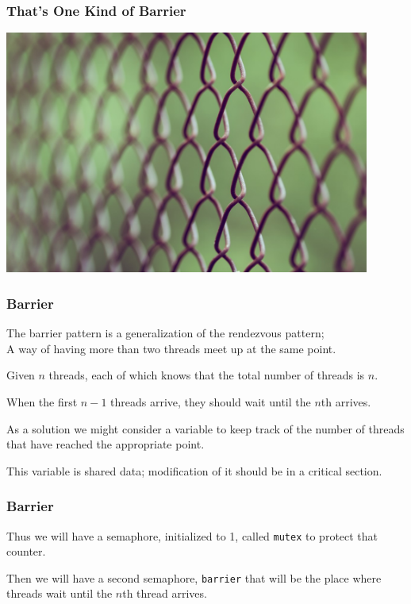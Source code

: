 \begin{frame}
	\frametitle{That's One Kind of Barrier}

	\begin{center}
		\includegraphics[width=0.9\textwidth]{images/fence-barrier.jpg}
	\end{center}

\end{frame}


\begin{frame}
	\frametitle{Barrier}

	The barrier pattern is a generalization of the rendezvous pattern;\\
	\quad A way of having more than two threads meet up at the same point.

	Given $n$ threads, each of which knows that the total number of threads is $n$.

	When the first $n-1$ threads arrive, they should wait until the $n$th arrives.

	As a solution we might consider a variable to keep track of the number of threads that have reached the appropriate point.

	This variable is shared data; modification of it should be in a critical section.


\end{frame}

\begin{frame}
	\frametitle{Barrier}

	Thus we will have a semaphore, initialized to 1, called \texttt{mutex} to protect that counter.

	Then we will have a second semaphore, \texttt{barrier} that will be the place where threads wait until the $n$th thread arrives.


\end{frame}

